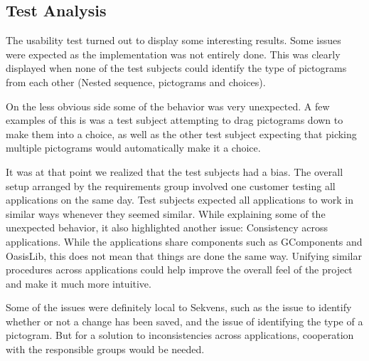 \subsection{Test Analysis}\label{subsec:test_analysis}
The usability test turned out to display some interesting results. Some issues were expected as the implementation was not entirely done. This was clearly displayed when none of the test subjects could identify the type of pictograms from each other (Nested sequence, pictograms and choices).

On the less obvious side some of the behavior was very unexpected. A few examples of this is was a test subject attempting to drag pictograms down to make them into a choice, as well as the other test subject expecting that picking multiple pictograms would automatically make it a choice.

It was at that point we realized that the test subjects had a bias. The overall setup arranged by the requirements group involved one customer testing all applications on the same day. Test subjects expected all applications to work in similar ways whenever they seemed similar. While explaining some of the unexpected behavior, it also highlighted another issue: Consistency across applications. While the applications share components such as GComponents and OasisLib, this does not mean that things are done the same way. Unifying similar procedures across applications could help improve the overall feel of the project and make it much more intuitive.

Some of the issues were definitely local to Sekvens, such as the issue to identify whether or not a change has been saved, and the issue of identifying the type of a pictogram. But for a solution to inconsistencies across applications, cooperation with the responsible groups would be needed.